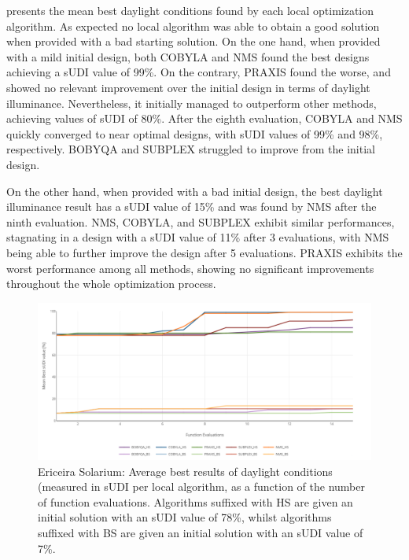  presents the mean best daylight conditions found by each local optimization algorithm. As expected no local algorithm was able to obtain a good solution when provided with a bad starting solution. On the one hand, when provided with a mild initial design, both COBYLA and NMS found the best designs achieving a \ac{sUDI} value of 99\%. On the contrary, PRAXIS found the worse, and showed no relevant improvement over the initial design in terms of daylight illuminance. Nevertheless, it initially managed to outperform other methods, achieving values of \ac{sUDI} of 80\%. After the eighth evaluation, COBYLA and NMS quickly converged to near optimal designs, with \ac{sUDI} values of 99\% and 98\%, respectively. BOBYQA and SUBPLEX struggled to improve from the initial design.

On the other hand, when provided with a bad initial design, the best daylight illuminance result has a \ac{sUDI} value of 15\% and was found by NMS after the ninth evaluation. NMS, COBYLA, and SUBPLEX exhibit similar performances, stagnating in a design with a \ac{sUDI} value of 11\% after 3 evaluations, with NMS being able to further improve the design after 5 evaluations. PRAXIS exhibits the worst performance among all methods, showing no significant improvements throughout the whole optimization process.

\begin{figure}[htbp]
	\centering
	\includegraphics[width=\textwidth]{Images/Evaluation/Ericeira_results_ph2.PNG}
	\caption[Ericeira Solarium: Average best results of daylight conditions (measured in \ac{sUDI}) per local algorithm]{Ericeira Solarium: Average best results of daylight conditions (measured in \ac{sUDI} per local algorithm, as a function of the number of function evaluations. Algorithms suffixed with HS are given an initial solution with an sUDI value of 78\%, whilst algorithms suffixed with BS are given an initial solution with an sUDI value of 7\%.}
	\label{fig:phase2results}
\end{figure}


